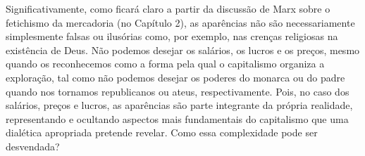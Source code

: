  \par 
Significativamente, como ficará claro a partir da discussão de Marx sobre o fetichismo da mercadoria (no Capítulo {\color{blue}2}), as aparências não são necessariamente simplesmente falsas ou ilusórias como, por exemplo, nas crenças religiosas na existência de Deus. Não podemos desejar os salários, os lucros e os preços, mesmo quando os reconhecemos como a forma pela qual o capitalismo organiza a exploração, tal como não podemos desejar os poderes do monarca ou do padre quando nos tornamos republicanos ou ateus, respectivamente. Pois, no caso dos salários, preços e lucros, as aparências são parte integrante da própria realidade, representando e ocultando aspectos mais fundamentais do capitalismo que uma dialética apropriada pretende revelar. Como essa complexidade pode ser desvendada?
 \par 
